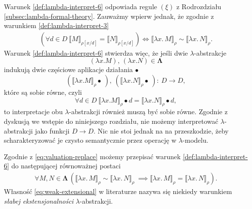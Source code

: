 Warunek \ref{def:lambda-interpret-6} odpowiada regule \((\xi)\) z Rodrozdziału \ref{subsec:lambda-formal-theory}.
Zauważmy wpierw jednak, że zgodnie z warunkiem \ref{def:lambda-interpret-3}
\begin{align*}
  (\forall d\in D\ \llbracket M \rrbracket_{\rho[x/d]}=\llbracket N \rrbracket_{\rho[x/d]})
\iff
\llbracket\lambda x.\,M\rrbracket_\rho \sim \llbracket \lambda x.\,N\rrbracket_\rho.
\tag{\dagger\dagger}\label{eq:valuation-replace}
\end{align*}
Warunek \ref{def:lambda-interpret-6} stwierdza więc, że jeśli dwie \(\lambda\)-abstrakcje 
\[(\lambda x. M),\,(\lambda x. N)\in\mathbf{\Lambda}\] indukują dwie częściowe aplikacje działania \(\bullet\)
\[(\llbracket \lambda x. M \rrbracket_\rho\bullet\ ),\ (\llbracket \lambda x. N \rrbracket_\rho\bullet\ ):\: D\to D,\]
które są sobie równe, czyli
\[
\forall d\in D\ \llbracket \lambda x. M \rrbracket_\rho\bullet d = \llbracket \lambda x. N \rrbracket_\rho\bullet d,
\]
to interpretacje obu \(\lambda\)-abstrakcji również muszą być sobie równe. Zgodnie z dyskusją we wstępie do niniejszego rozdziału,
nie możemy interpretować \(\lambda\)-abstrakcji jako funkcji \(D\to D\). Nic nie stoi jednak na na przeszkodzie, żeby scharakteryzować je  
czysto semantycznie przez operację w \(\lambda\)-modelu.




Zgodnie z \eqref{eq:valuation-replace} możemy przepisać warunek \ref{def:lambda-interpret-6} do następującej równoważnej postaci
  \begin{align}
    \forall M,N\in\mathbf{\Lambda}\,\left(\llbracket\lambda x.\,M\rrbracket_\rho \sim \llbracket \lambda x.\,N\rrbracket_\rho\ \implies \llbracket \lambda x.\,M\rrbracket_\rho = \llbracket \lambda x.\,N\rrbracket_\rho\right).\tag{vi'}\label{eq:weak-extensional}
    \end{align}  
Własność \eqref{eq:weak-extensional} w literaturze nazywa się niekiedy warunkiem \emph{słabej ekstensjonalności} \(\lambda\)-abstrakcji.

